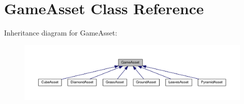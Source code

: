 \hypertarget{class_game_asset}{}\section{Game\+Asset Class Reference}
\label{class_game_asset}


Inheritance diagram for Game\+Asset\+:
\nopagebreak
\begin{figure}[H]
\begin{center}
\leavevmode
\includegraphics[width=350pt]{class_game_asset__inherit__graph}
\end{center}
\end{figure}
